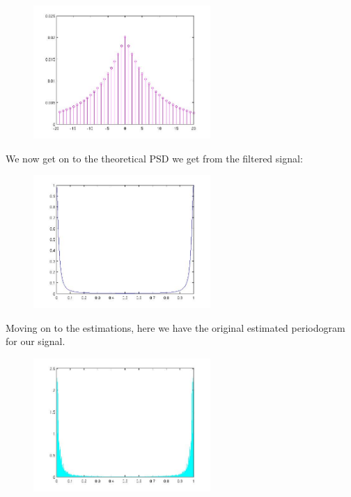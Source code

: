 \documentclass[a4paper,11pt]{article}
\begin{document}
\begin{figure}[!hp]
    \begin{center}
    \includegraphics[width=0.6\textwidth]{images/lab2_redo_figure14.jpg}
    \end{center}
\end{figure}

\newpage

We now get on to the theoretical PSD we get from the filtered signal:

\begin{figure}[!hp]
    \begin{center}
    \includegraphics[width=0.6\textwidth]{images/lab2_redo_figure2.jpg}
    \end{center}
\end{figure}

Moving on to the estimations, here we have the original estimated periodogram for our signal.

\begin{figure}[!hp]
    \begin{center}
    \includegraphics[width=0.6\textwidth]{images/lab2_redo_figure3.jpg}
    \end{center}
\end{figure}
\end{document}

